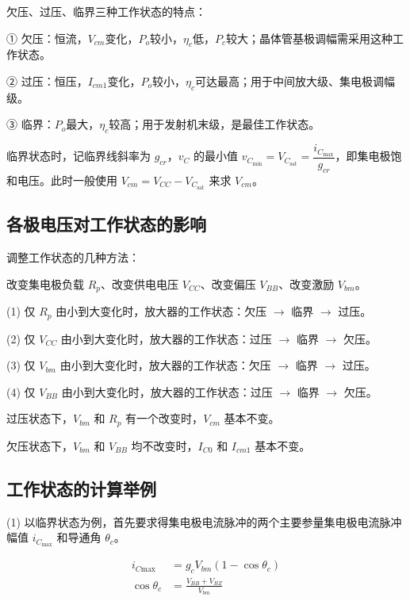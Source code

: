 欠压、过压、临界三种工作状态的特点：

① 欠压：恒流，$V_{cm}$变化，$P_o$较小，$\eta_c$低，$P_c$较大；晶体管基极调幅需采用这种工作状态。

② 过压：恒压，$I_{cm1}$变化，$P_o$较小，$\eta_c$可达最高；用于中间放大级、集电极调幅级。

③ 临界：$P_o$最大，$\eta_c$较高；用于发射机末级，是最佳工作状态。

临界状态时，记临界线斜率为 $g_{cr}$，$v_C$ 的最小值 $v_{C_{\text{min}}} = V_{C_{\text{sat}}} = \dfrac{i_{C_{\text{max}}}}{g_{cr}}$，即集电极饱和电压。此时一般使用 $V_{cm} = V_{CC} - V_{C_{\text{sat}}}$ 来求 $V_{cm}$。

\subsection{各极电压对工作状态的影响}

调整工作状态的几种方法：

改变集电极负载 $R_p$、改变供电电压 $V_{CC}$、改变偏压 $V_{BB}$、改变激励 $V_{bm}$。

(1) 仅 $R_p$ 由小到大变化时，放大器的工作状态：欠压 $\rightarrow$ 临界 $\rightarrow$ 过压。

(2) 仅 $V_{CC}$ 由小到大变化时，放大器的工作状态：过压 $\rightarrow$ 临界 $\rightarrow$ 欠压。

(3) 仅 $V_{bm}$ 由小到大变化时，放大器的工作状态：欠压 $\rightarrow$ 临界 $\rightarrow$ 过压。

(4) 仅 $V_{BB}$ 由小到大变化时，放大器的工作状态：过压 $\rightarrow$ 临界 $\rightarrow$ 欠压。

过压状态下，$V_{bm}$ 和 $R_p$ 有一个改变时，$V_{cm}$ 基本不变。

欠压状态下，$V_{bm}$ 和 $V_{BB}$ 均不改变时，$I_{C0}$ 和 $I_{cm1}$ 基本不变。

\subsection{工作状态的计算举例}

(1) 以临界状态为例，首先要求得集电极电流脉冲的两个主要参量集电极电流脉冲幅值 $i_{C_{\text{max}}}$ 和导通角 $\theta_c$。

\begin{equation}
\begin{aligned}
    i_{C \text{max}}  &= g_c V_{bm} (1 - \cos{\theta_c}) \\
    \cos{\theta_c} &= \frac{V_{BB} + V_{BZ}}{V_{bm}}
\end{aligned}
\end{equation}

